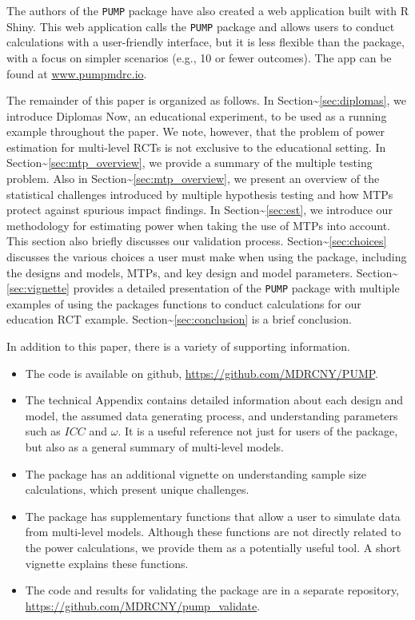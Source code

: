 \documentclass[
]{article}
\providecommand{\tightlist}{%
  \setlength{\itemsep}{0pt}\setlength{\parskip}{0pt}}
\begin{document}
The authors of the \texttt{PUMP} package have also created a web
application built with R Shiny. This web application calls the
\texttt{PUMP} package and allows users to conduct calculations with a
user-friendly interface, but it is less flexible than the package, with
a focus on simpler scenarios (e.g., 10 or fewer outcomes). The app can
be found at \url{www.pumpmdrc.io}.

The remainder of this paper is organized as follows. In
Section\textasciitilde{}\ref{sec:diplomas}, we introduce Diplomas Now,
an educational experiment, to be used as a running example throughout
the paper. We note, however, that the problem of power estimation for
multi-level RCTs is not exclusive to the educational setting. In
Section\textasciitilde{}\ref{sec:mtp_overview}, we provide a summary of
the multiple testing problem. Also in
Section\textasciitilde{}\ref{sec:mtp_overview}, we present an overview
of the statistical challenges introduced by multiple hypothesis testing
and how MTPs protect against spurious impact findings. In
Section\textasciitilde{}\ref{sec:est}, we introduce our methodology for
estimating power when taking the use of MTPs into account. This section
also briefly discusses our validation process.
Section\textasciitilde{}\ref{sec:choices} discusses the various choices
a user must make when using the package, including the designs and
models, MTPs, and key design and model parameters.
Section\textasciitilde{}\ref{sec:vignette} provides a detailed
presentation of the \texttt{PUMP} package with multiple examples of
using the packages functions to conduct calculations for our education
RCT example. Section\textasciitilde{}\ref{sec:conclusion} is a brief
conclusion.

In addition to this paper, there is a variety of supporting information.

\begin{itemize}
\tightlist
\item
  The code is available on github, \url{https://github.com/MDRCNY/PUMP}.
\item
  The technical Appendix contains detailed information about each design
  and model, the assumed data generating process, and understanding
  parameters such as \(ICC\) and \(\omega\). It is a useful reference
  not just for users of the package, but also as a general summary of
  multi-level models.
\item
  The package has an additional vignette on understanding sample size
  calculations, which present unique challenges.
\item
  The package has supplementary functions that allow a user to simulate
  data from multi-level models. Although these functions are not
  directly related to the power calculations, we provide them as a
  potentially useful tool. A short vignette explains these functions.
\item
  The code and results for validating the package are in a separate
  repository, \url{https://github.com/MDRCNY/pump_validate}.
\end{itemize}
\end{document}
